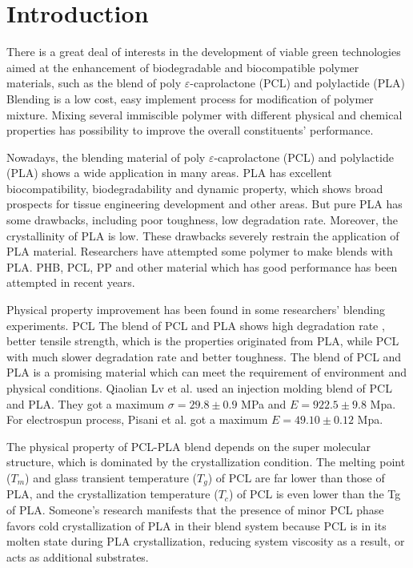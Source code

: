 \documentclass{Head}
\begin{document}
\linenumbers
\tableofcontents
  \enabstract{
  \lipsum[1]
  }
\section{Introduction} %
  There is a great deal of interests in the development of viable green technologies aimed at the enhancement of biodegradable and biocompatible polymer materials, such as the blend of poly $\varepsilon$-caprolactone (PCL) and polylactide (PLA)
  Blending is a low cost, easy implement process for modification of polymer mixture.
  Mixing several immiscible polymer with different physical and chemical properties has possibility to improve the overall constituents' performance. 


  Nowadays, the blending material of poly $\varepsilon$-caprolactone (PCL) and polylactide (PLA) shows a wide application in many areas. 
  PLA has excellent biocompatibility, biodegradability and dynamic property, which shows broad prospects for tissue engineering development and other areas. 
  But pure PLA has some drawbacks, including poor toughness, low degradation rate.
  Moreover, the crystallinity of PLA is low.
  These drawbacks severely restrain the application of PLA material. 
  Researchers have attempted some polymer to make blends with PLA. 
  PHB, PCL, PP and other material which has good performance has been attempted in recent years. %


  Physical property improvement has been found in some researchers'  blending experiments. 
  PCL 
  The blend of PCL and PLA shows high degradation rate , better tensile strength, which is the properties originated from PLA, while PCL with much slower degradation rate and better toughness.
  The blend of PCL and PLA is a promising material which can meet the requirement of environment and physical conditions.
  Qiaolian Lv et al.\cite{RN73} used an injection molding blend of PCL and PLA.
  They got a maximum $\sigma=29.8\pm0.9$ MPa and $E=922.5\pm9.8$ Mpa. 
  For electrospun process, Pisani et al.\cite{RN58} got a maximum $E=49.10\pm0.12$ Mpa.


  The physical property of PCL-PLA blend depends on the super molecular structure, which is dominated by the crystallization condition.
  The melting point ($T_m$) and glass transient temperature ($T_g$) of PCL are far lower than those of PLA, and the crystallization temperature ($T_c$) of PCL is even lower than the Tg of PLA. 
  Someone's research manifests that the presence of minor PCL phase favors cold crystallization of PLA in their blend system because PCL is in its molten state during PLA crystallization, reducing system viscosity as a result, or acts as additional substrates.
\end{document}
